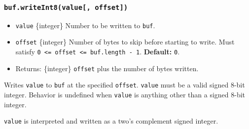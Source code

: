 \begin{Shaded}
\begin{Highlighting}[]
\NormalTok{ \{ }\NormalTok{ \} }\OperatorTok{=} \NormalTok{(}\NormalTok{)}\OperatorTok{;}

\OperatorTok{=} \NormalTok{(}\NormalTok{)}\OperatorTok{;}

\NormalTok{(}\OperatorTok{,} \NormalTok{)}\OperatorTok{;}

\OperatorTok{;}
\end{Highlighting}
\end{Shaded}

\subsubsection{\texorpdfstring{\texttt{buf.writeInt8(value{[},\ offset{]})}}{buf.writeInt8(value{[}, offset{]})}}\label{buf.writeint8value-offset}

\begin{itemize}
\tightlist
\item
  \texttt{value} \{integer\} Number to be written to \texttt{buf}.
\item
  \texttt{offset} \{integer\} Number of bytes to skip before starting to
  write. Must satisfy
  \texttt{0\ \textless{}=\ offset\ \textless{}=\ buf.length\ -\ 1}.
  \textbf{Default:} \texttt{0}.
\item
  Returns: \{integer\} \texttt{offset} plus the number of bytes written.
\end{itemize}

Writes \texttt{value} to \texttt{buf} at the specified \texttt{offset}.
\texttt{value} must be a valid signed 8-bit integer. Behavior is
undefined when \texttt{value} is anything other than a signed 8-bit
integer.

\texttt{value} is interpreted and written as a two's complement signed
integer.

